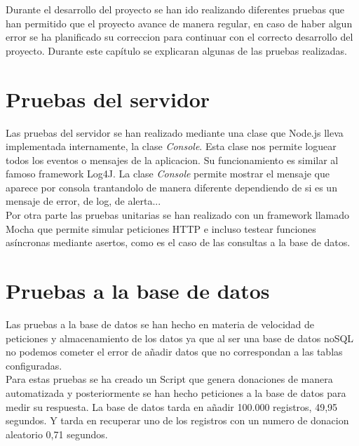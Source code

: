 Durante el desarrollo del proyecto se han ido realizando diferentes pruebas que han permitido que el proyecto avance de manera regular, en caso de haber algun error se ha planificado su correccion para continuar con el correcto desarrollo del proyecto. Durante este capítulo se explicaran algunas de las pruebas realizadas.

\section{Pruebas del servidor}
Las pruebas del servidor se han realizado mediante una clase que Node.js lleva implementada internamente, la clase \textit{Console}. Esta clase nos permite loguear todos los eventos o mensajes de la aplicacion. Su funcionamiento es similar al famoso framework Log4J. La clase \textit{Console} permite mostrar el mensaje que aparece por consola trantandolo de manera diferente dependiendo de si es un mensaje de error, de log, de alerta...\\

Por otra parte las pruebas unitarias se han realizado con un framework llamado Mocha\cite{mocha} que permite simular peticiones HTTP e incluso testear funciones asíncronas mediante asertos, como es el caso de las consultas a la base de datos.

\section{Pruebas a la base de datos}
Las pruebas a la base de datos se han hecho en materia de velocidad de peticiones y almacenamiento de los datos ya que al ser una base de datos noSQL no podemos cometer el error de añadir datos que no correspondan a las tablas configuradas.\\

Para estas pruebas se ha creado un Script que genera donaciones de manera automatizada y posteriormente se han hecho peticiones a la base de datos para medir su respuesta. La base de datos tarda en añadir 100.000 registros, 49,95 segundos. Y tarda en recuperar uno de los registros con un numero de donacion aleatorio 0,71 segundos.\\
\newpage
{}
